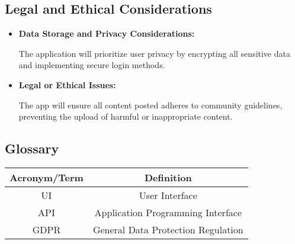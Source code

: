 \documentclass{article}
\begin{document}
\subsection{Legal and Ethical Considerations}
\begin{itemize}
    \item \textbf{Data Storage and Privacy Considerations:}
        
            The application will prioritize user privacy by encrypting all sensitive data and implementing secure login methods.
        
    \item \textbf{Legal or Ethical Issues:}
        
            The app will ensure all content posted adheres to community guidelines, preventing the upload of harmful or inappropriate content.
        
\end{itemize}

\subsection{Glossary}
\begin{tabular}{|c|c|}
    \hline
    \textbf{Acronym/Term} & \textbf{Definition} \\
    \hline
    UI & User Interface \\
    API & Application Programming Interface \\
    GDPR & General Data Protection Regulation \\
    \hline
\end{tabular}
\end{document}
